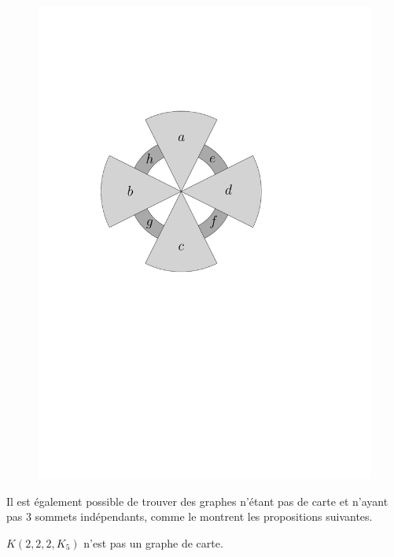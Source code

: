 \documentclass{scrartcl}
\begin{document}
\begin{flushleft}
\begin{figure}[h]
\begin{center}
        \hspace*{1.5cm}
        \includegraphics[page=\ipeFigpinch, scale = 0.6]{figs}
    \end{center}
\end{figure}

Il est également possible de trouver des graphes n'étant pas de carte et n'ayant pas $3$ sommets indépendants, comme le montrent les
propositions suivantes.

\begin{prop}\label{K222K5}
    $K(2,2,2,K_5)$ n'est pas un graphe de carte.
\end{prop}


\end{flushleft}
\end{document}

